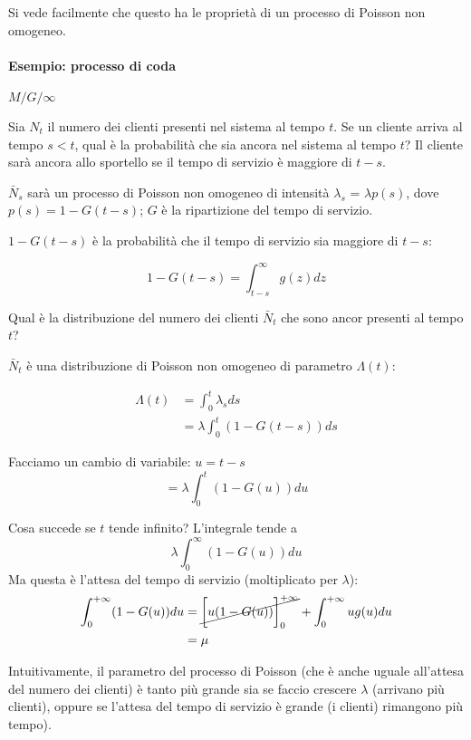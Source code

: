 \documentclass[a4paper,12pt]{book}
\begin{document}
Si vede facilmente che questo ha le proprietà di un processo di Poisson non omogeneo. 

\paragraph{Esempio: processo di coda } $ M/G/\infty $ %

Sia $ N_t $ il numero dei clienti presenti nel sistema al tempo $ t $. Se un cliente arriva al tempo $ s < t $, qual è la probabilità che sia ancora nel sistema al tempo $ t $? Il cliente sarà ancora allo sportello se il tempo di servizio è maggiore di $ t - s $. 

$ \bar{N}_s $ sarà un processo di Poisson non omogeneo di intensità $\lambda_s$ = $\lambda p(s)$, dove $ p(s) = 1 - G(t-s) $; $ G $ è la ripartizione del tempo di servizio.

$ 1 - G(t - s) $ è la probabilità che il tempo di servizio sia maggiore di $ t - s $:

$$ 1 - G(t-s) = \int_{t-s}^{\infty} g(z) dz $$

Qual è la distribuzione del numero dei clienti $ \bar{N}_t $ che sono ancor presenti al tempo $ t $?

$ \bar{N}_t $ è una distribuzione di Poisson non omogeneo di parametro $\Lambda(t)$:

\begin{align*}
	\Lambda(t) & = \int_{0}^{t}\lambda_s ds \\
	& = \lambda \int_{0}^{t} (1 - G(t-s)) ds
\end{align*}

Facciamo un cambio di variabile: $ u = t-s $
$$ = \lambda\int_{0}^{t}( 1 - G(u)) du $$

Cosa succede se $ t $ tende infinito? L'integrale tende a 
$$ \lambda \int_0^{\infty} ( 1 - G(u)) du $$
Ma questa è l'attesa del tempo di servizio (moltiplicato per $\lambda$):
\begin{align*}
	\int_{0}^{+\infty} ( 1 - G(u)) du  & = \cancel{\bigg[ u( 1 - G(u)) \bigg]_0^{+\infty}} + \int_{0}^{+\infty} ug(u) du \\
	& = \mu
\end{align*}

Intuitivamente, il parametro del processo di Poisson (che è anche uguale all'attesa del numero dei clienti) è tanto più grande sia se faccio crescere $\lambda$ (arrivano più clienti), oppure se l'attesa del tempo di servizio è grande (i clienti) rimangono più tempo).
\end{document}
